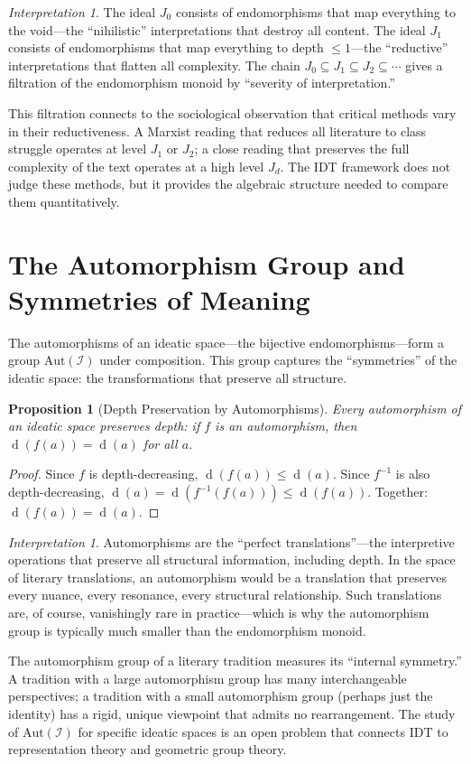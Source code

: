 \documentclass[11pt,openany]{book}
\theoremstyle{definition}
\theoremstyle{plain}
\newtheorem{proposition}[axiom]{Proposition}
\theoremstyle{remark}
\newtheorem{interpretation}[axiom]{Interpretation}
\newcommand{\IS}{\mathcal{I}}               %
\newcommand{\depth}{\operatorname{d}}       %
\begin{document}
\begin{interpretation}
The ideal $J_0$ consists of endomorphisms that map everything to the void---the ``nihilistic'' interpretations that destroy all content. The ideal $J_1$ consists of endomorphisms that map everything to depth $\leq 1$---the ``reductive'' interpretations that flatten all complexity. The chain $J_0 \subseteq J_1 \subseteq J_2 \subseteq \cdots$ gives a filtration of the endomorphism monoid by ``severity of interpretation.''

This filtration connects to the sociological observation that critical methods vary in their reductiveness. A Marxist reading that reduces all literature to class struggle operates at level $J_1$ or $J_2$; a close reading that preserves the full complexity of the text operates at a high level $J_d$. The IDT framework does not judge these methods, but it provides the algebraic structure needed to compare them quantitatively.
\end{interpretation}

\section{The Automorphism Group and Symmetries of Meaning}

The automorphisms of an ideatic space---the bijective endomorphisms---form a group $\mathrm{Aut}(\IS)$ under composition. This group captures the ``symmetries'' of the ideatic space: the transformations that preserve all structure.

\begin{proposition}[Depth Preservation by Automorphisms]
Every automorphism of an ideatic space preserves depth: if $f$ is an automorphism, then $\depth(f(a)) = \depth(a)$ for all $a$.
\end{proposition}

\begin{proof}
Since $f$ is depth-decreasing, $\depth(f(a)) \leq \depth(a)$. Since $f^{-1}$ is also depth-decreasing, $\depth(a) = \depth(f^{-1}(f(a))) \leq \depth(f(a))$. Together: $\depth(f(a)) = \depth(a)$.
\end{proof}

\begin{interpretation}
Automorphisms are the ``perfect translations''---the interpretive operations that preserve all structural information, including depth. In the space of literary translations, an automorphism would be a translation that preserves every nuance, every resonance, every structural relationship. Such translations are, of course, vanishingly rare in practice---which is why the automorphism group is typically much smaller than the endomorphism monoid.

The automorphism group of a literary tradition measures its ``internal symmetry.'' A tradition with a large automorphism group has many interchangeable perspectives; a tradition with a small automorphism group (perhaps just the identity) has a rigid, unique viewpoint that admits no rearrangement. The study of $\mathrm{Aut}(\IS)$ for specific ideatic spaces is an open problem that connects IDT to representation theory and geometric group theory.
\end{interpretation}
\end{document}
